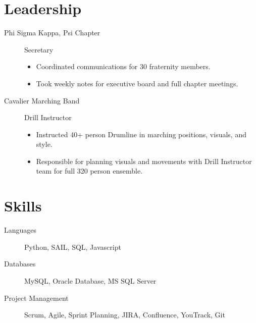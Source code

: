 \documentclass{mycv}
\begin{document}
\section{Leadership}
\vspace{-\parskip}%
\begin{description}
  \item[Phi Sigma Kappa, Psi Chapter] Secretary
  \begin{itemize}
    \item Coordinated communications for 30 fraternity members.
    \item Took weekly notes for executive board and full chapter meetings.
  \end{itemize} 
  \item[Cavalier Marching Band] Drill Instructor
  \begin{itemize}
    \item Instructed 40+ person Drumline in marching positions, visuals, and style.
    \item Responsible for planning visuals and movements with Drill Instructor team for full 320 person ensemble.
  \end{itemize} 
\end{description}

\section{Skills}
\begin{description}
  \item[Languages] Python, SAIL, SQL, Javascript
  \item[Databases] MySQL, Oracle Database, MS SQL Server
  \item[Project Management] Scrum, Agile, Sprint Planning, JIRA, Confluence, YouTrack, Git
\end{description}
\end{document}
